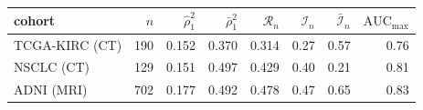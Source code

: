 \begin{tabular}{lrrrrrrr}
\toprule
cohort & $n$ & $\hat\rho_1^2$ & $\bar\rho_1^2$ & $\mathcal{R}_n$ & $\mathcal{I}_n$ & $\bar{\mathcal{I}}_n$ & $\mathrm{AUC}_{\max}$\\
\midrule
TCGA-KIRC (CT) & 190 & 0.152 & 0.370 & 0.314 & 0.27 & 0.57 & 0.76\\
NSCLC (CT) & 129 & 0.151 & 0.497 & 0.429 & 0.40 & 0.21 & 0.81\\
ADNI (MRI) & 702 & 0.177 & 0.492 & 0.478 & 0.47 & 0.65 & 0.83\\
\bottomrule
\end{tabular}
